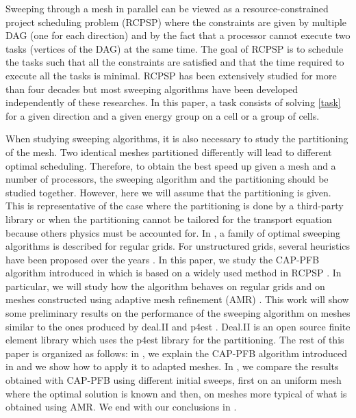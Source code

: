 \documentclass[letterpaper]{article}
\renewcommand{\(}{\left(}
\renewcommand{\)}{\right)}
\renewcommand{\[}{\left[}
\renewcommand{\]}{\right]}
\begin{document}
Sweeping through a mesh in parallel can be viewed as a resource-constrained
project scheduling problem (RCPSP) \cite{Brucker1999,Kolisch2006} where the
constraints are given by multiple DAG (one for each direction) and by the fact
that a processor cannot execute two tasks (vertices of the DAG) at the same
time. The goal of RCPSP is to schedule the tasks such that all the constraints are
satisfied and that the time required to execute all the tasks is minimal. 
RCPSP has been extensively studied for more than four decades
\cite{Pritsker1969} but most sweeping algorithms have been developed
independently of these researches. In this paper, a task consists of solving
\cref{task} for a given direction and a given energy group on a cell or a group
of cells.

When studying sweeping algorithms, it is also necessary to study the
partitioning of the mesh. Two identical meshes partitioned differently will lead
to different optimal scheduling. Therefore, to obtain the best speed up given a
mesh and a number of processors, the sweeping algorithm and the partitioning
should be studied together. However, here we will assume that the
partitioning is given. This is representative of the case where the partitioning
is done by a third-party library or when the partitioning cannot be tailored for
the transport equation because others physics must be accounted for. In
\cite{Adams2013}, a family of optimal sweeping algorithms is described for
regular grids. For unstructured grids, several heuristics have been proposed
over the years
\cite{Pautz2002,Plimpton2005,Yan2013,Colomer2013,Kumar2005,Mo2014}. In this
paper, we study the CAP-PFB algorithm introduced in \cite{Mo2014} which is based
on a widely used method in RCPSP \cite{Li1992}. In particular, we will study how
the algorithm behaves on regular grids and on meshes constructed using adaptive
mesh refinement (AMR)
\cite{Arnold2000,Baker2002,Bangerth2007,Jessee1998,Wang2010a}. This work will
show some preliminary results on the performance of the sweeping algorithm on 
meshes similar to
the ones produced by deal.II \cite{Bangerth2007,Bangerth2013} and p4est
\cite{Burstedde2011}. Deal.II is an open source finite element library which
uses the p4est library for the partitioning. The rest of this paper is organized
as follows: in , we explain the CAP-PFB algorithm
introduced in \cite{Mo2014} and we show how to apply it to adapted meshes. In
, we compare the results obtained with CAP-PFB using different
initial sweeps, first on an uniform mesh where the optimal solution is known
\cite{Adams2013} and then, on meshes more typical of what is obtained using AMR.
We end with our conclusions in .
\end{document}
